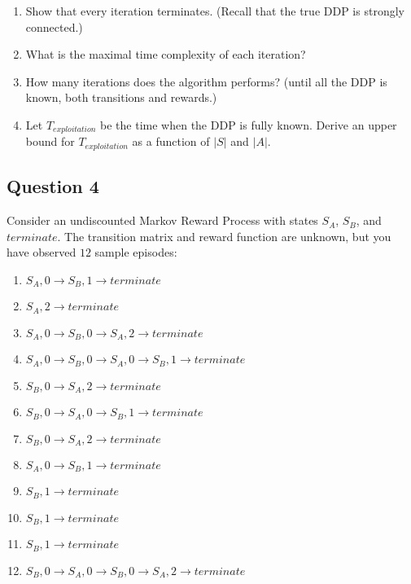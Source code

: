 \documentclass[11pt]{article}
\begin{document}
\begin{enumerate}[label=(\alph*)]
\item
Show that every iteration terminates. (Recall that the true DDP is strongly connected.)
\item What is the maximal time complexity of each iteration?
\item How many iterations does the algorithm performs? (until all the DDP is known, both transitions and rewards.) 
\item Let $T_{exploitation}$ be the time when the DDP is fully known. Derive an upper bound for $T_{exploitation}$ as a function of $|S|$ and $|A|$.
\end{enumerate}

\subsection{Question 4}
Consider an undiscounted Markov Reward Process with states $S_A$, $S_B$, and $terminate$. The transition matrix and reward function are unknown, but you have observed $12$ sample episodes:

\begin{enumerate}
\item $S_A,0\rightarrow S_B,1\rightarrow terminate$
\item $S_A,2\rightarrow terminate$
\item $S_A,0\rightarrow S_B,0\rightarrow S_A,2\rightarrow terminate$
\item $S_A,0\rightarrow S_B,0\rightarrow S_A,0\rightarrow S_B,1\rightarrow terminate$
\item $S_B,0\rightarrow S_A,2\rightarrow terminate$
\item $S_B,0\rightarrow S_A,0\rightarrow   S_B,1 \rightarrow terminate$
\item $S_B,0\rightarrow S_A,2\rightarrow terminate$
\item $S_A,0\rightarrow S_B,1\rightarrow terminate$
\item $S_B,1\rightarrow terminate$
\item $S_B,1\rightarrow terminate$
\item $S_B,1\rightarrow terminate$
\item $S_B,0\rightarrow S_A,0\rightarrow   S_B,0 \rightarrow S_A,2\rightarrow terminate$
\end{enumerate}
\end{document}
